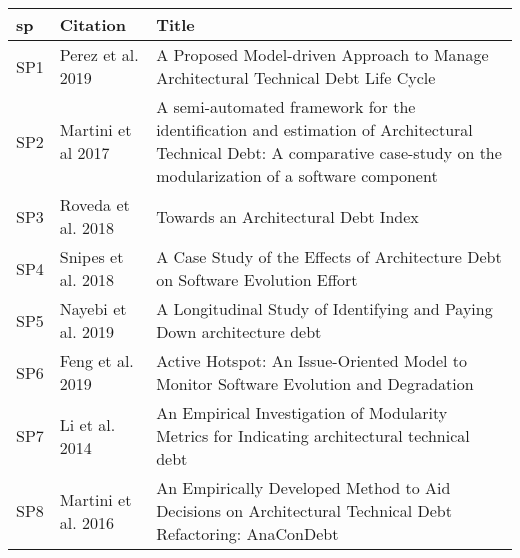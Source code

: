 \begin{tabular}{lll}
\toprule
   sp &                                                                 Citation &                                                                                                                                                                     Title \\
\midrule
  SP1 &                                                        Perez et al. 2019 &                                                                                        A Proposed Model-driven Approach to Manage Architectural Technical Debt Life Cycle \\
  SP2 &                                                       Martini et al 2017 &  A semi-automated framework for the identification and estimation of Architectural Technical Debt: A comparative case-study on the modularization of a software component \\
  SP3 &                                                       Roveda et al. 2018 &                                                                                                                                       Towards an Architectural Debt Index \\
  SP4 &                                                       Snipes et al. 2018 &                                                                                             A Case Study of the Effects of Architecture Debt on Software Evolution Effort \\
  SP5 &                                                       Nayebi et al. 2019 &                                                                                                     A Longitudinal Study of Identifying and Paying Down architecture debt \\
  SP6 &                                                         Feng et al. 2019 &                                                                                     Active Hotspot: An Issue-Oriented Model to Monitor Software Evolution and Degradation \\
  SP7 &                                                           Li et al. 2014 &                                                                              An Empirical Investigation of Modularity Metrics for Indicating architectural technical debt \\
  SP8 &                                                      Martini et al. 2016 &                                                                  An Empirically Developed Method to Aid Decisions on Architectural Technical Debt Refactoring: AnaConDebt \\

\end{tabular}
